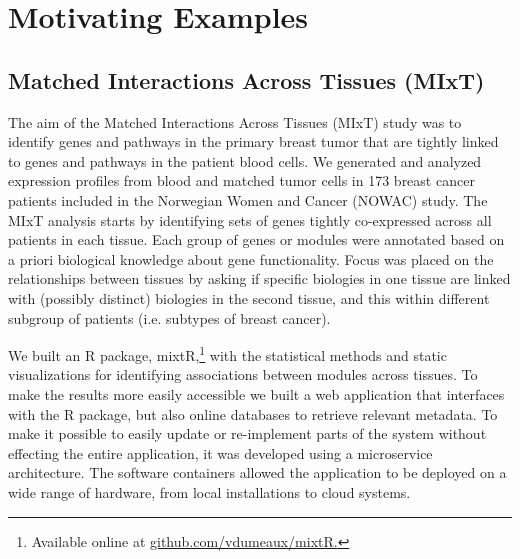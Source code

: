 \section{Motivating Examples}
\subsection{Matched Interactions Across Tissues (MIxT)}
The aim of the Matched Interactions Across Tissues (MIxT) study was to identify
genes and pathways in the primary breast tumor that are tightly linked to genes
and pathways in the patient blood cells.\cite{vanessa} We generated and analyzed
expression profiles from blood and matched tumor cells in 173 breast cancer
patients included in the Norwegian Women and Cancer (NOWAC) study.  The MIxT
analysis starts by identifying sets of genes tightly co-expressed across all
patients in each tissue. Each group of genes or modules were annotated based on
a priori biological knowledge about gene functionality.  Focus was placed
on the relationships between tissues by asking if specific biologies in one
tissue are linked with (possibly distinct) biologies in the second tissue, and
this within different subgroup of patients (i.e. subtypes of breast cancer).

We built an R package, mixtR,\footnote{Available online at
\url{github.com/vdumeaux/mixtR.}} with the statistical methods and static
visualizations for identifying associations between modules across tissues. To
make the results more easily accessible we built a web application that
interfaces with the R package, but also online databases to retrieve relevant
metadata. To make it possible to easily update or re-implement parts of the
system without effecting the entire application, it was developed using a
microservice architecture.  The software containers allowed the application to
be deployed on a wide range of hardware, from local installations to cloud
systems.

